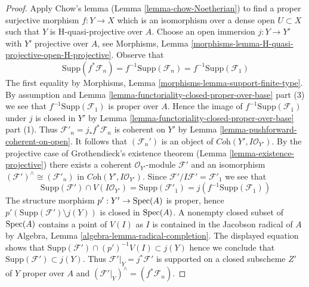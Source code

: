 \begin{proof}
\medskip\noindent
Apply Chow's lemma (Lemma \ref{lemma-chow-Noetherian}) to find a
proper surjective morphism $f : Y \to X$ which is an isomorphism
over a dense open $U \subset X$ such that $Y$ is H-quasi-projective
over $A$. Choose an open immersion $j : Y \to Y'$ with
$Y'$ projective over $A$, see
Morphisms, Lemma \ref{morphisms-lemma-H-quasi-projective-open-H-projective}.
Observe that
$$
\text{Supp}(f^*\mathcal{F}_n) = f^{-1}\text{Supp}(\mathcal{F}_n) =
f^{-1}\text{Supp}(\mathcal{F}_1)
$$
The first equality by
Morphisms, Lemma \ref{morphisms-lemma-support-finite-type}.
By assumption and
Lemma \ref{lemma-functoriality-closed-proper-over-base} part (3)
we see that $f^{-1}\text{Supp}(\mathcal{F}_1)$ is proper over $A$.
Hence the image of $f^{-1}\text{Supp}(\mathcal{F}_1)$
under $j$ is closed in $Y'$ by
Lemma \ref{lemma-functoriality-closed-proper-over-base} part (1).
Thus $\mathcal{F}'_n = j_*f^*\mathcal{F}_n$ is coherent on
$Y'$ by Lemma \ref{lemma-pushforward-coherent-on-open}.
It follows that $(\mathcal{F}_n')$
is an object of $\textit{Coh}(Y', I\mathcal{O}_{Y'})$.
By the projective case of Grothendieck's existence theorem
(Lemma \ref{lemma-existence-projective})
there exists a coherent $\mathcal{O}_{Y'}$-module
$\mathcal{F}'$ and an isomorphism
$(\mathcal{F}')^\wedge \cong (\mathcal{F}'_n)$ in
$\textit{Coh}(Y', I\mathcal{O}_{Y'})$.
Since $\mathcal{F}'/I\mathcal{F}' = \mathcal{F}'_1$ we see that
$$
\text{Supp}(\mathcal{F}') \cap V(I\mathcal{O}_{Y'}) =
\text{Supp}(\mathcal{F}'_1) = j(f^{-1}\text{Supp}(\mathcal{F}_1))
$$
The structure morphism $p' : Y' \to \mathop{\mathrm{Spec}}(A)$ is proper, hence
$p'(\text{Supp}(\mathcal{F}') \setminus j(Y))$
is closed in $\mathop{\mathrm{Spec}}(A)$. A nonempty closed subset of $\mathop{\mathrm{Spec}}(A)$
contains a point of $V(I)$ as $I$ is contained in the Jacobson radical
of $A$ by Algebra, Lemma \ref{algebra-lemma-radical-completion}.
The displayed equation shows that
$\text{Supp}(\mathcal{F}') \cap (p')^{-1}V(I) \subset j(Y)$
hence we conclude that $\text{Supp}(\mathcal{F}') \subset j(Y)$.
Thus $\mathcal{F}'|_Y = j^*\mathcal{F}'$
is supported on a closed subscheme $Z'$ of $Y$ proper over $A$
and $(\mathcal{F}'|_Y)^\wedge = (f^*\mathcal{F}_n)$.


\end{proof}
